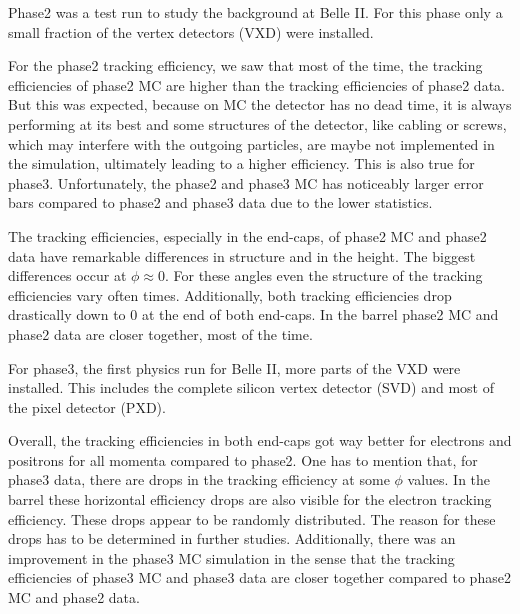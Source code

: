 \documentclass[a4paper,11pt,twosided,final,german,openbib,pdftex,listof=totoc,bibliography=totoc]{scrbook}
\begin{document}
Phase2 was a test run to study the background at Belle II. For this phase only a small fraction of the vertex detectors (VXD) were installed.

For the phase2 tracking efficiency, we saw that most of the time, the tracking efficiencies of phase2 MC are higher than the tracking efficiencies of phase2 data. But this was expected, because on MC the detector has no dead time, it is always performing at its best and some structures of the detector, like cabling or screws, which may interfere with the outgoing particles, are maybe not implemented in the simulation, ultimately leading to a higher efficiency. This is also true for phase3. Unfortunately, the phase2 and phase3 MC has noticeably larger error bars compared to phase2 and phase3 data due to the lower statistics.
\newline

The tracking efficiencies, especially in the end-caps, of phase2 MC and phase2 data have remarkable differences in structure and in the height. The biggest differences occur at $\phi \approx 0$. For these angles even the structure of the tracking efficiencies vary often times. Additionally, both tracking efficiencies drop drastically down to 0 at the end of both end-caps. In the barrel phase2 MC and phase2 data are closer together, most of the time.
\newline

For phase3, the first physics run for Belle II, more parts of the VXD were installed. This includes the complete silicon vertex detector (SVD) and most of the pixel detector (PXD). 

Overall, the tracking efficiencies in both end-caps got way better for electrons and positrons for all momenta compared to phase2. One has to mention that, for phase3 data, there are drops in the tracking efficiency at some $\phi$ values.
In the barrel these horizontal efficiency drops are also visible for the electron tracking efficiency.
These drops appear to be randomly distributed. The reason for these drops has to be determined in further studies. Additionally, there was an improvement in the phase3 MC simulation in the sense that the tracking efficiencies of phase3 MC and phase3 data are closer together compared to phase2 MC and phase2 data.

 
 
\end{document}
